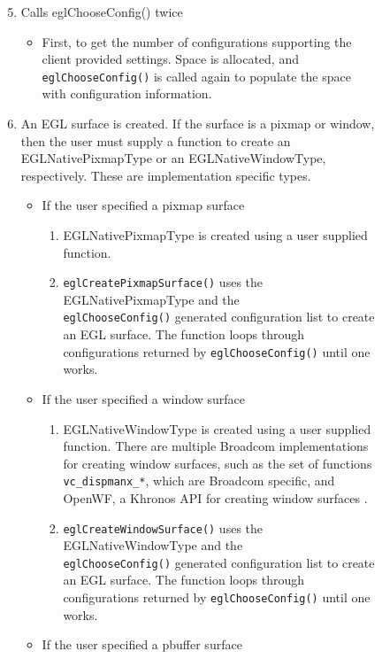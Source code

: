 \documentclass[12pt]{report}
\begin{document}
\begin{figure}[H]
\ContinuedFloat
\begin{mdframed}[style=default]
\begin{enumerate}
\setcounter{enumi}{4}
\item Calls eglChooseConfig() twice
\begin{itemize}
\item First, to get the number of configurations supporting the client
  provided settings.  Space is allocated, and {\tt eglChooseConfig()}
  is called again to populate the space with configuration information.
\end{itemize}
\item An EGL surface is created. If the surface is a pixmap or window,
then the user must supply a function to create an EGLNativePixmapType
or an EGLNativeWindowType, respectively. These are implementation
specific types.
\begin{itemize}
\item If the user specified a pixmap surface
\begin{enumerate}
\item EGLNativePixmapType is created using a user supplied function.
\item {\tt eglCreatePixmapSurface()} uses the EGLNativePixmapType and
the\\ {\tt eglChooseConfig()} generated configuration list to create an
EGL surface. The function loops through configurations
returned by {\tt eglChooseConfig()} until one works.
\end{enumerate}
\item If the user specified a window surface
\begin{enumerate}
\item EGLNativeWindowType is created using a user supplied
  function. There are multiple Broadcom implementations for creating
  window surfaces, such as the set of functions {\tt vc\_dispmanx\_*},
  which are Broadcom specific, and OpenWF, a Khronos API for creating
  window surfaces \cite{rPiVid}.
\item {\tt eglCreateWindowSurface()} uses the EGLNativeWindowType and the\\
{\tt eglChooseConfig()} generated configuration list to create an
EGL surface. The function loops through configurations
returned by {\tt eglChooseConfig()} until one works.
\end{enumerate}
\item If the user specified a pbuffer surface
\begin{enumerate}

\end{enumerate}
\end{itemize}
\end{enumerate}
\end{mdframed}
\end{figure}
\end{document}
